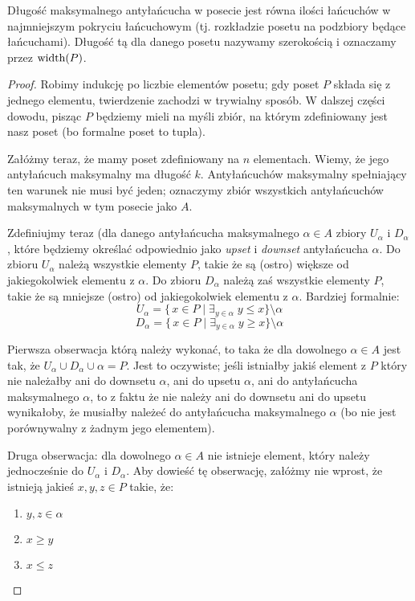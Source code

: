 \begin{theorem}
	Długość maksymalnego antyłańcucha w posecie jest równa ilości łańcuchów w najmniejszym pokryciu łańcuchowym
	(tj. rozkładzie posetu na podzbiory będące łańcuchami). Długość tą dla danego posetu nazywamy szerokością i oznaczamy
	przez \(\text{width}(P)\).
\end{theorem}

\begin{proof}
	Robimy indukcję po liczbie elementów posetu; gdy poset \(P\) składa się z jednego elementu, twierdzenie zachodzi w trywialny sposób. W dalszej części dowodu, pisząc \(P\) będziemy mieli na myśli zbiór, na którym zdefiniowany jest nasz poset (bo formalne poset to tupla).

	Załóżmy teraz, że mamy poset zdefiniowany na \(n\) elementach. Wiemy, że jego antyłańcuch maksymalny ma długość \(k\). Antyłańcuchów maksymalny spełniający ten warunek nie musi być jeden; oznaczymy zbiór wszystkich antyłańcuchów maksymalnych w tym posecie jako \(A\).

	Zdefiniujmy teraz (dla danego antyłańcucha maksymalnego \( \alpha \in A\) zbiory \(U_{\alpha}\) i \(D_{\alpha}\), które będziemy określać odpowiednio jako \textit{upset} i \textit{downset} antyłańcucha \(\alpha\). Do zbioru \(U_{\alpha}\) należą wszystkie elementy \(P\), takie że są (ostro) większe od jakiegokolwiek elementu z \(\alpha\). Do zbioru \(D_{\alpha}\) należą zaś wszystkie elementy \(P\), takie że są mniejsze (ostro) od jakiegokolwiek elementu z \(\alpha\). Bardziej formalnie:
	\begin{equation*}
		U_{\alpha} = \{\,x \in P \mid \exists_{y \in \alpha} \;  y \leq x \} \setminus \alpha
	\end{equation*}
	\begin{equation*}
		D_{\alpha} = \{\,x \in P \mid \exists_{y \in \alpha} \; y \geq x \} \setminus \alpha
	\end{equation*}

	Pierwsza obserwacja którą należy wykonać, to taka że dla dowolnego \(\alpha \in A\) jest tak, że  \(U_{\alpha} \cup D_{\alpha} \cup \alpha = P\). Jest to oczywiste; jeśli istniałby jakiś element z \(P\) który nie należałby ani do downsetu \(\alpha\), ani do upsetu \(\alpha\), ani do antyłańcucha maksymalnego \(\alpha\), to z faktu że nie należy ani do downsetu ani do upsetu wynikałoby, że musiałby należeć do antyłańcucha maksymalnego \(\alpha\) (bo nie jest porównywalny z żadnym jego elementem).

	Druga obserwacja: dla dowolnego \(\alpha \in A\) nie istnieje element, który należy jednocześnie do \(U_{\alpha}\) i \(D_{\alpha}\). Aby dowieść tę obserwację, załóżmy nie wprost, że istnieją jakieś \(x, y, z \in P\) takie, że:
	\begin{enumerate}
		\item \(y, z \in \alpha\)
		\item \( x \geq y\)
		\item \( x \leq z\)
	\end{enumerate}


\end{proof}
